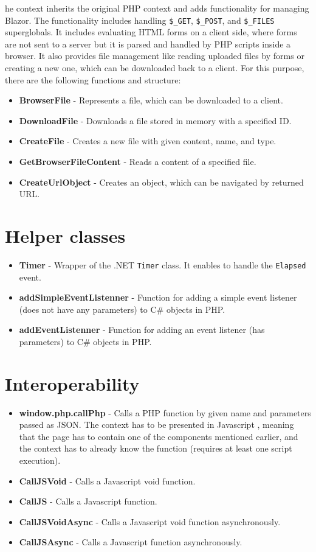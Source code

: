 he context inherits the original PHP context and adds functionality for managing Blazor. The  functionality includes handling \texttt{\$\_GET}, \texttt{\$\_POST}, and \texttt{\$\_FILES} superglobals. It includes evaluating HTML forms on a client side, where forms are not sent to a server but it is parsed and handled by PHP scripts inside a browser. It also provides file management like reading uploaded files by forms or creating a new one, which can be downloaded back to a client.  For this purpose, there are the following functions and structure:
\par
\begin{itemize}
\item \textbf{BrowserFile} - Represents a file, which can be downloaded to a client.
\item \textbf{DownloadFile} - Downloads a file stored in memory with a specified ID.
\item \textbf{CreateFile} - Creates a new file with given content, name, and type.
\item \textbf{GetBrowserFileContent} - Reads a content of a specified file.
\item \textbf{CreateUrlObject} - Creates an object, which can be navigated by returned URL.
\end{itemize}

\section{Helper classes}

\begin{itemize}
\item \textbf{Timer} - Wrapper of the .NET \texttt{Timer} class. It enables to handle the \texttt{Elapsed} event.
\item \textbf{addSimpleEventListenner} - Function for adding a simple event listener (does not have any parameters) to C\# objects in PHP.
\item \textbf{addEventListenner} - Function for adding an event listener (has parameters) to C\# objects in PHP.
\end{itemize}

\section{Interoperability}

\begin{itemize}
\item \textbf{window.php.callPhp} - Calls a PHP function by given name and parameters passed as JSON. The context has to be presented in Javascript , meaning that the page has to contain one of the components mentioned earlier, and the context has to already know the function (requires at least one script execution).
\item \textbf{CallJSVoid} - Calls a Javascript void function.
\item \textbf{CallJS} - Calls a Javascript function.
\item \textbf{CallJSVoidAsync} - Calls a Javascript void function asynchronously.
\item \textbf{CallJSAsync} - Calls a Javascript function asynchronously.
\end{itemize}
